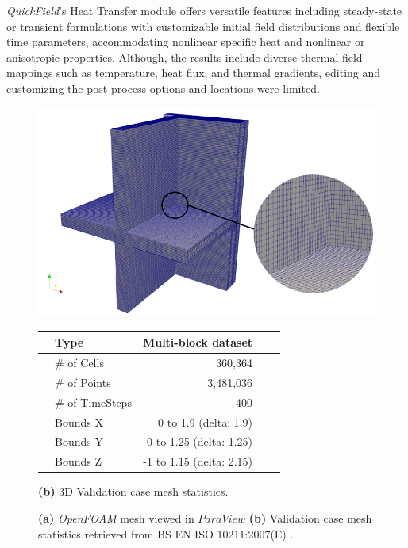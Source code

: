 \textit{QuickField}'s Heat Transfer module offers versatile features including steady-state or transient formulations with customizable initial field distributions and flexible time parameters, accommodating nonlinear specific heat and nonlinear or anisotropic properties. Although, the results include diverse thermal field mappings such as temperature, heat flux, and thermal gradients, editing and customizing the post-process options and locations were limited.



\begin{figure}[tbh]
    \centering
    \begin{minipage}[t]{0.75\columnwidth}
        \centering
        \includegraphics[width=\linewidth]{Figures/mesh3.png}
    \end{minipage}
    \hfill
    \begin{minipage}[t]{0.5\columnwidth}
        \centering
        \begin{tabular}{clrrr}    
            \toprule
            & Type       & Multi-block dataset   \\ \midrule
            & \# of Cells & 360,364                      \\
            & \# of Points                        & 3,481,036                  \\
            & \# of TimeSteps                  & 400                        \\
            & Bounds X          & 0 to 1.9 (delta: 1.9) \\
            & Bounds Y          &                     0 to 1.25 (delta: 1.25) \\
            & Bounds Z          &                     -1 to 1.15 (delta: 2.15)    \\  \bottomrule
        \end{tabular}
        \caption*{\textbf{(b)} 3D Validation case mesh statistics.}
        \label{tab:mesh-stats}
    \end{minipage}
    
    \caption[3D Validation Mesh and Mesh Statistics]{\textbf{(a)} \textit{OpenFOAM} mesh viewed in $ParaView$ \textbf{(b)}  Validation case mesh statistics retrieved from BS EN ISO 10211:2007(E) \cite{ISO}.}
    \label{fig:validation-case}
\end{figure}




